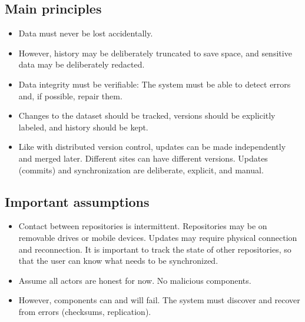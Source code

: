 \documentclass[a4paper]{article}
\begin{document}
\subsection{Main principles}

\begin{itemize}

  \item Data must never be lost accidentally.

  \item However, history may be deliberately truncated to save space, and
    sensitive data may be deliberately redacted.

  \item Data integrity must be verifiable: The system must be able to detect
    errors and, if possible, repair them.

  \item Changes to the dataset should be tracked, versions should be explicitly
    labeled, and history should be kept.

  \item Like with distributed version control, updates can be made independently
    and merged later. Different sites can have different versions. Updates
    (commits) and synchronization are deliberate, explicit, and manual.

\end{itemize}


\subsection{Important assumptions}

\begin{itemize}

  \item Contact between repositories is intermittent. Repositories may be on
    removable drives or mobile devices. Updates may require physical connection
    and reconnection. It is important to track the state of other repositories,
    so that the user can know what needs to be synchronized.

  \item Assume all actors are honest for now. No malicious components.

  \item However, components can and will fail. The system must discover and
    recover from errors (checksums, replication).

\end{itemize}
\end{document}
